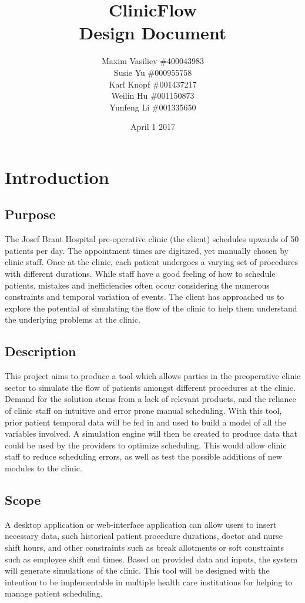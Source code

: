 \documentclass[12pt]{article}
\title{
ClinicFlow
\\\vspace{10mm}
\large \textbf{Design Document}
\vspace{40mm}
}
\author{ Maxim Vasiliev \#400043983\\
Susie Yu \#000955758\\
Karl Knopf \#001437217\\
Weilin Hu \#001150873\\
Yunfeng Li \#001335650
}
\date{April 1 2017}
\begin{document}
\maketitle
\newpage
\tableofcontents
\newpage
{}


\section{Introduction}

\subsection{Purpose}
The Josef Brant Hospital pre-operative clinic (the client) schedules upwards of 50 patients per day. The appointment times are digitized, yet manually chosen by clinic staff. Once at the clinic, each patient undergoes a varying set of procedures with different durations. While staff have a good feeling of how to schedule patients, mistakes and inefficiencies often occur considering the numerous constraints and temporal variation of events. The client has approached us to explore the potential of simulating the flow of the clinic to help them understand the underlying problems at the clinic.

\subsection{Description}
This project aims to produce a tool which allows parties in the preoperative clinic sector to simulate the flow of patients amongst different procedures at the clinic. Demand for the solution stems from a lack of relevant products, and the reliance of clinic staff on intuitive and error prone manual scheduling. With this tool, prior patient temporal data will be fed in and used to build a model of all the variables involved. A simulation engine will then be created to produce data that could be used by the providers to optimize scheduling. This would allow clinic staff to reduce scheduling errors, as well as test the possible additions of new modules to the clinic.

\subsection{Scope}
A desktop application or web-interface application can allow users to insert necessary data, such historical patient procedure durations, doctor and nurse shift hours, and other constraints such as break allotments or soft constraints such as employee shift end times. Based on provided data and inputs, the system will generate simulations of the clinic. This tool will be designed with the intention to be implementable in multiple health care institutions for helping to manage patient scheduling.
\newpage
\end{document}
